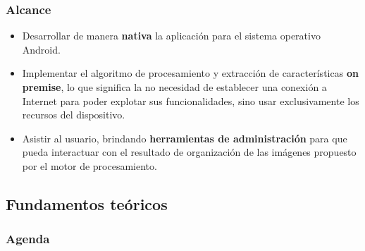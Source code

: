 \begin{frame}[t,fragile]
\frametitle {Alcance}


\begin{itemize}
	\item Desarrollar de manera \textbf{nativa} la aplicación para el sistema operativo Android.
	\vspace{2mm}
	\item Implementar el algoritmo de procesamiento y extracción de características \textbf{on premise}, lo que significa la no necesidad de establecer una conexión a Internet para poder explotar sus funcionalidades, sino usar exclusivamente los recursos del dispositivo.
	\vspace{2mm}
	\item Asistir al usuario, brindando \textbf{herramientas de administración} para que pueda interactuar con el resultado de organización de las imágenes propuesto por el motor de procesamiento.
\end{itemize}


\end{frame}

\subsection{Fundamentos teóricos}

\watermarkon
\begin{frame}
\frametitle{Agenda}

\end{frame}
\watermarkoff

